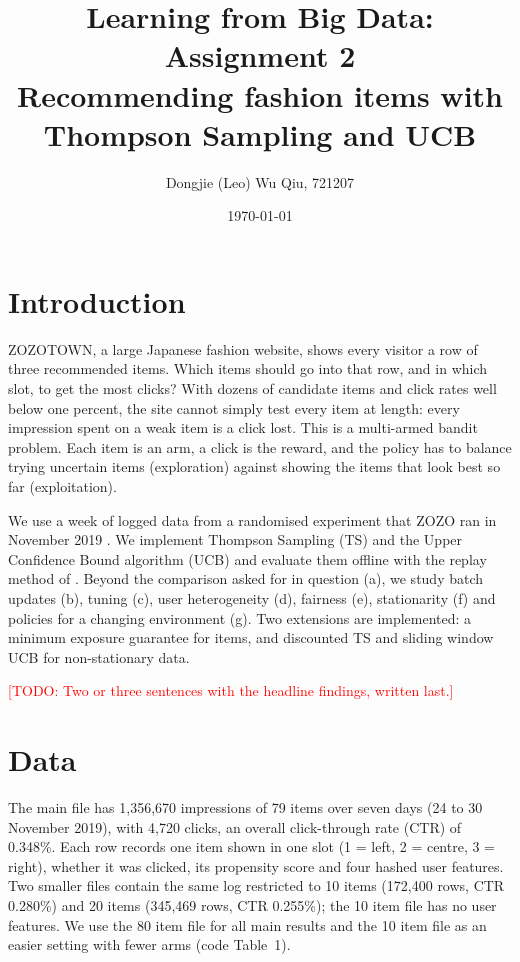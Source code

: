 \documentclass[11pt]{article}
\title{Learning from Big Data: Assignment 2\\[2pt]
       \large Recommending fashion items with Thompson Sampling and UCB}
\author{Dongjie (Leo) Wu Qiu, 721207 \studentnumber}
\date{\today}
\newcommand{\todo}[1]{\textcolor{red}{[TODO: #1]}}
\begin{document}
\maketitle

\section{Introduction}

ZOZOTOWN, a large Japanese fashion website, shows every visitor a row of three
recommended items. Which items should go into that row, and in which slot, to
get the most clicks? With dozens of candidate items and click rates well below
one percent, the site cannot simply test every item at length: every
impression spent on a weak item is a click lost. This is a multi-armed bandit
problem. Each item is an arm, a click is the reward, and the policy has to
balance trying uncertain items (exploration) against showing the items that
look best so far (exploitation).

We use a week of logged data from a randomised experiment that ZOZO ran in
November 2019 \citep{saito2021}. We implement Thompson Sampling (TS) and the
Upper Confidence Bound algorithm (UCB) and evaluate them offline with the
replay method of \citet{li2011}. Beyond the comparison asked for in question
(a), we study batch updates (b), tuning (c), user heterogeneity (d), fairness
(e), stationarity (f) and policies for a changing environment (g). Two
extensions are implemented: a minimum exposure guarantee for items, and
discounted TS and sliding window UCB for non-stationary data.

\todo{Two or three sentences with the headline findings, written last.}

\section{Data}

The main file has 1{,}356{,}670 impressions of 79 items over seven days
(24 to 30 November 2019), with 4{,}720 clicks, an overall click-through rate
(CTR) of 0.348\%. Each row records one item shown in one slot (1 = left,
2 = centre, 3 = right), whether it was clicked, its propensity score and four
hashed user features. Two smaller files contain the same log restricted to 10
items (172{,}400 rows, CTR 0.280\%) and 20 items (345{,}469 rows, CTR 0.255\%);
the 10 item file has no user features. We use the 80 item file for all main
results and the 10 item file as an easier setting with fewer arms
(code Table~1).
\end{document}
